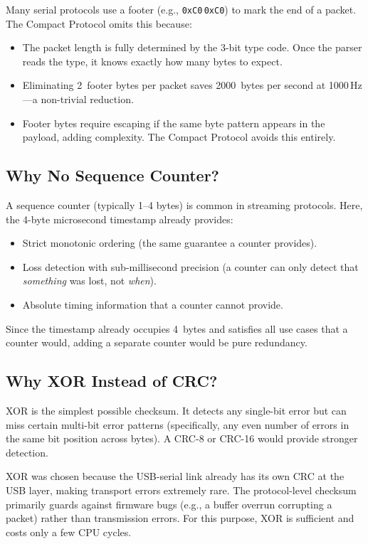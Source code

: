 \documentclass[11pt,a4paper]{article}
\newcommand{\hexval}[1]{\texttt{0x#1}}
\begin{document}
Many serial protocols use a footer (e.g., \hexval{C0}\,\hexval{C0}) to mark the end of a packet.  The Compact Protocol omits this because:

\begin{itemize}
    \item The packet length is fully determined by the 3-bit type code.  Once the parser reads the type, it knows exactly how many bytes to expect.
    \item Eliminating 2~footer bytes per packet saves 2000~bytes per second at 1000\,Hz---a non-trivial reduction.
    \item Footer bytes require escaping if the same byte pattern appears in the payload, adding complexity.  The Compact Protocol avoids this entirely.
\end{itemize}

\subsection{Why No Sequence Counter?}

A sequence counter (typically 1--4 bytes) is common in streaming protocols.  Here, the 4-byte microsecond timestamp already provides:

\begin{itemize}
    \item Strict monotonic ordering (the same guarantee a counter provides).
    \item Loss detection with sub-millisecond precision (a counter can only detect that \textit{something} was lost, not \textit{when}).
    \item Absolute timing information that a counter cannot provide.
\end{itemize}

Since the timestamp already occupies 4~bytes and satisfies all use cases that a counter would, adding a separate counter would be pure redundancy.

\subsection{Why XOR Instead of CRC?}

XOR is the simplest possible checksum.  It detects any single-bit error but can miss certain multi-bit error patterns (specifically, any even number of errors in the same bit position across bytes).  A CRC-8 or CRC-16 would provide stronger detection.

XOR was chosen because the USB-serial link already has its own CRC at the USB layer, making transport errors extremely rare.  The protocol-level checksum primarily guards against firmware bugs (e.g., a buffer overrun corrupting a packet) rather than transmission errors.  For this purpose, XOR is sufficient and costs only a few CPU cycles.
\end{document}
